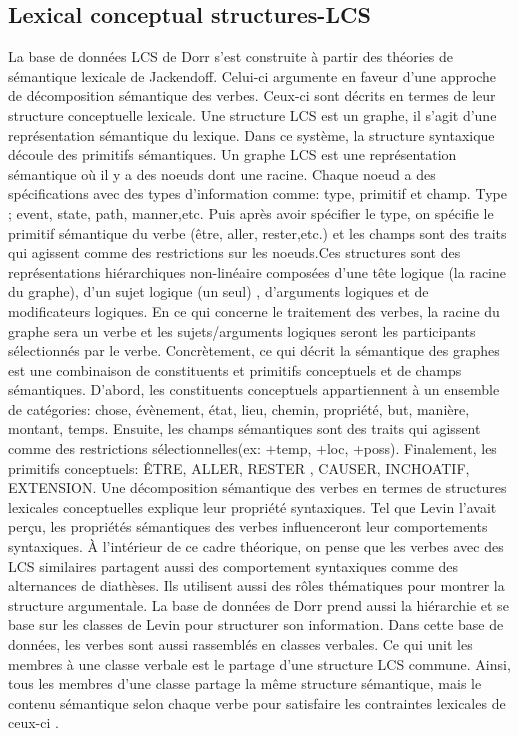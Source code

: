 \subsection{Lexical conceptual structures-LCS}
La base de données LCS de Dorr s'est construite à partir des théories de sémantique lexicale de Jackendoff. Celui-ci argumente en faveur d'une approche de décomposition sémantique des verbes. Ceux-ci sont décrits en termes de leur structure conceptuelle lexicale\citep{DorrUseLexicalSemantics1992}. Une structure LCS est un graphe, il s'agit d'une représentation sémantique du lexique. Dans ce système, la structure syntaxique découle des primitifs sémantiques. Un graphe LCS est une représentation sémantique où il y a des noeuds dont une racine. Chaque noeud a des spécifications avec des types d'information comme: type, primitif et champ. Type ; event, state, path, manner,etc. Puis après avoir spécifier le type, on spécifie le primitif sémantique du verbe (être, aller, rester,etc.)  et les champs sont des traits qui agissent comme des restrictions sur les noeuds.Ces structures sont des représentations hiérarchiques non-linéaire composées d'une tête logique (la racine du graphe), d'un sujet logique (un seul) , d'arguments logiques et de modificateurs logiques. En ce qui concerne le traitement des verbes, la racine du graphe sera un verbe et les sujets/arguments logiques seront les participants sélectionnés par le verbe. Concrètement, ce qui décrit la sémantique des graphes est une combinaison de constituents et primitifs conceptuels et de champs sémantiques. D'abord, les constituents conceptuels appartiennent à un ensemble de catégories: chose, évènement, état, lieu, chemin, propriété, but, manière, montant, temps. Ensuite, les champs sémantiques sont des traits qui agissent comme des restrictions sélectionnelles(ex: +temp, +loc, +poss). Finalement, les primitifs conceptuels: ÊTRE, ALLER, RESTER , CAUSER, INCHOATIF, EXTENSION. Une décomposition sémantique des verbes en termes de structures lexicales conceptuelles explique leur propriété syntaxiques. Tel que Levin l'avait perçu, les propriétés sémantiques des verbes influenceront leur comportements syntaxiques. À l'intérieur de ce cadre théorique, on pense que les verbes avec des LCS similaires partagent aussi des comportement syntaxiques comme des alternances de diathèses. Ils utilisent aussi des rôles thématiques pour montrer la structure argumentale. La base de données de Dorr prend aussi la hiérarchie et se base sur les classes de Levin pour structurer son information. Dans cette base de données, les verbes sont aussi rassemblés en classes verbales. Ce qui unit les membres à une classe verbale est le partage d'une structure LCS commune. Ainsi, tous les membres d'une classe partage la même structure sémantique, mais le contenu sémantique selon chaque verbe pour satisfaire les contraintes lexicales de ceux-ci \citep{TraumGenerationLexicalConceptual2000}. 

